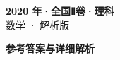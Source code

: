 \documentclass[zihao=-4, a4paper]{ctexart}
\begin{document}
\begin{center}
  {\Large\bfseries 2020 年·全国Ⅱ卷·理科}\\[4pt]
  {\large 数学 · 解析版}
\end{center}
\medskip
{}

\clearpage
{}
\begin{center}{\Large\bfseries 参考答案与详细解析}\end{center}
\medskip

\end{document}
